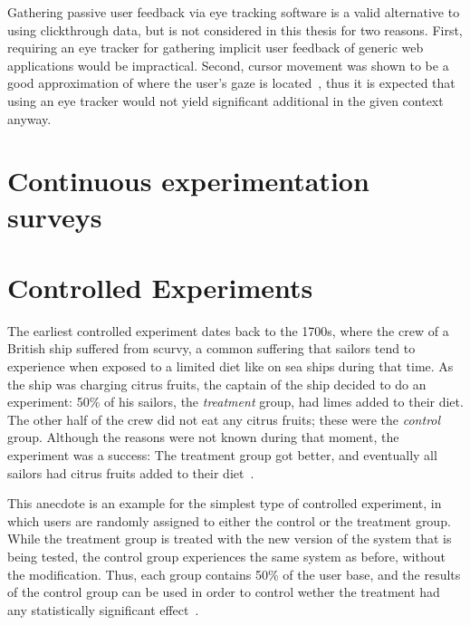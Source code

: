 \cite{Kelly:2003:IFI:959258.959260}

Gathering passive user feedback via eye tracking software is a valid alternative to using clickthrough data, but is not considered in this thesis for two reasons.
First, requiring an eye tracker for gathering implicit user feedback of generic web applications would be impractical.
Second, cursor movement was shown to be a good approximation of where the user's gaze is located~\cite{Huang2011}, thus it is expected that using an eye tracker would not yield significant additional in the given context anyway.

\section{Continuous experimentation surveys}
\label{sec:related:surveys}

\cite{lindgren2015software}

\cite{Bosch2012}

\cite{Gutbrod2017}

\section{Controlled Experiments}
\label{sec:fundamentals:experiments}

The earliest controlled experiment dates back to the 1700s, where the crew of a British ship suffered from scurvy, a common suffering that sailors tend to experience when exposed to a limited diet like on sea ships during that time.
As the ship was charging citrus fruits, the captain of the ship decided to do an experiment: 50\% of his sailors, the \emph{treatment} group, had limes added to their diet.
The other half of the crew did not eat any citrus fruits; these were the \emph{control} group.
Although the reasons were not known during that moment, the experiment was a success: The treatment group got better, and eventually all sailors had citrus fruits added to their diet~\cite{rossi2003evaluation,marks2000progress}.

This anecdote is an example for the simplest type of controlled experiment, in which users are randomly assigned to either the control or the treatment group.
While the treatment group is treated with the new version of the system that is being tested, the control group experiences the same system as before, without the modification.
Thus, each group contains 50\% of the user base, and the results of the control group can be used in order to control wether the treatment had any statistically significant effect~\cite{Kohavi2009}.

